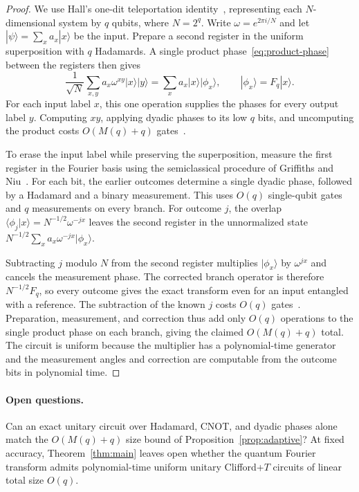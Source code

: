 \documentclass[11pt]{article}
\newcommand{\CFT}{Clifford+$T$}
\begin{document}
\begin{proof}
We use Hall's one-dit teleportation identity~\cite[Fig.~1]{hall2007}, representing each $N$-dimensional system by $q$ qubits, where $N=2^q$. Write $\omega=e^{2\pi i/N}$ and let $|\psi\rangle=\sum_x a_x|x\rangle$ be the input. Prepare a second register in the uniform superposition with $q$ Hadamards. A single product phase~\eqref{eq:product-phase} between the registers then gives
\[
\frac{1}{\sqrt N}\sum_{x,y} a_x\omega^{xy}|x\rangle|y\rangle
=\sum_x a_x|x\rangle|\phi_x\rangle,\qquad |\phi_x\rangle=F_q|x\rangle.
\]
For each input label $x$, this one operation supplies the phases for every output label $y$. Computing $xy$, applying dyadic phases to its low $q$ bits, and uncomputing the product costs $O(M(q)+q)$ gates~\cite[Lemma~2.1]{kmps2026}.

To erase the input label while preserving the superposition, measure the first register in the Fourier basis using the semiclassical procedure of Griffiths and Niu~\cite{gn1996}. For each bit, the earlier outcomes determine a single dyadic phase, followed by a Hadamard and a binary measurement. This uses $O(q)$ single-qubit gates and $q$ measurements on every branch. For outcome $j$, the overlap $\langle\phi_j|x\rangle=N^{-1/2}\omega^{-jx}$ leaves the second register in the unnormalized state $N^{-1/2}\sum_x a_x\omega^{-jx}|\phi_x\rangle$.

Subtracting $j$ modulo $N$ from the second register multiplies $|\phi_x\rangle$ by $\omega^{jx}$ and cancels the measurement phase. The corrected branch operator is therefore $N^{-1/2}F_q$, so every outcome gives the exact transform even for an input entangled with a reference. The subtraction of the known $j$ costs $O(q)$ gates~\cite{cdkm2004}. Preparation, measurement, and correction thus add only $O(q)$ operations to the single product phase on each branch, giving the claimed $O(M(q)+q)$ total. The circuit is uniform because the multiplier has a polynomial-time generator and the measurement angles and correction are computable from the outcome bits in polynomial time.
\end{proof}

\paragraph{Open questions.}
Can an exact unitary circuit over Hadamard, CNOT, and dyadic phases alone match the $O(M(q) + q)$ size bound of Proposition~\ref{prop:adaptive}? At fixed accuracy, Theorem~\ref{thm:main} leaves open whether the quantum Fourier transform admits polynomial-time uniform unitary \CFT{} circuits of linear total size $O(q)$.
\end{document}
